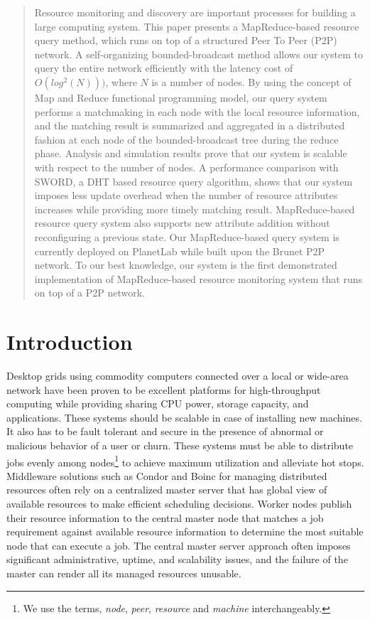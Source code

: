 \documentclass{acm_proc_article-sp}
\begin{document}
\begin{abstract}
Resource monitoring and discovery are important processes for building a large computing system.
This paper presents a MapReduce-based resource query method, which runs on top of a structured Peer To Peer (P2P) network.
A self-organizing bounded-broadcast method allows our system to query the entire network efficiently with the latency cost of $O(log^2(N)))$, where $N$ is a number of nodes.
By using the concept of Map and Reduce functional programming model, our query system performs a matchmaking in each node with the local resource information,
and the matching result is summarized and aggregated in a distributed fashion at each node of the bounded-broadcast tree during the reduce phase.
Analysis and simulation results prove that our system is scalable with respect to the number of nodes. A performance comparison with SWORD, a DHT based resource query algorithm,
shows that our system imposes less update overhead when the number of resource attributes increases while providing more timely matching result.
MapReduce-based resource query system also supports new attribute addition without reconfiguring a previous state.
Our MapReduce-based query system is currently deployed on PlanetLab while built upon the Brunet P2P network. To our best knowledge, our system is the first demonstrated implementation of MapReduce-based resource monitoring system that runs on top of a P2P network.
\end{abstract}
\section{Introduction}
Desktop grids\cite{bonic}\cite{condor} using commodity computers connected over a local or wide-area network have been proven to be excellent platforms 
for high-throughput computing while providing sharing CPU power, storage  capacity, and applications.
These systems should be scalable in case of installing new machines. It also has to be fault tolerant and secure in the presence of abnormal or malicious behavior of a user or churn. 
These systems must be able to distribute jobs evenly among nodes\footnote{We use the terms, \textit{node}, \textit{peer}, \textit{resource} and \textit{machine} interchangeably.} to achieve maximum utilization and alleviate hot stops. 
Middleware solutions such as Condor\cite{condor} and Boinc\cite{bonic} for managing distributed resources often rely on a centralized master server that has global view of available resources to make efficient scheduling decisions. 
Worker nodes publish their resource information to the central master node that matches a job requirement against available resource information to determine the most suitable node that can execute a job. 
The central master server approach often imposes significant administrative, uptime, and scalability issues, and the failure of the master can render all its managed resources unusable.  
\end{document}
